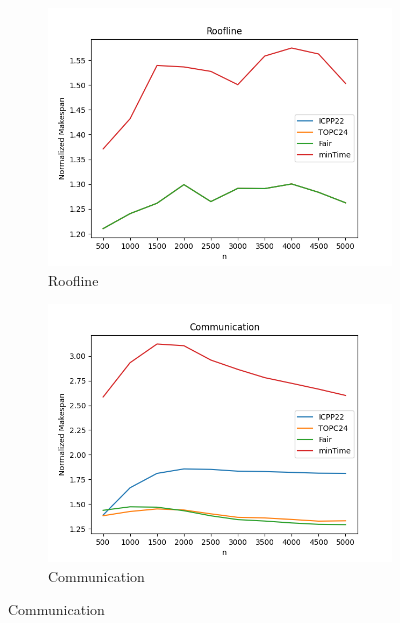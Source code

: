 \documentclass{article}
\begin{document}
\begin{figure}[htbp]
\centering
\begin{subfigure}[b]{0.32\textwidth}\includegraphics[width=\textwidth]{Results/n/n_Roofline}\caption{Roofline}\label{fig:lines_figures_n_Roofline}\end{subfigure}
\hfill
\begin{subfigure}[b]{0.32\textwidth}\includegraphics[width=\textwidth]{Results/n/n_Communication}\caption{Communication}\label{fig:lines_figures_n_Communication}\end{subfigure}
\hfill

\end{figure}
\end{document}
